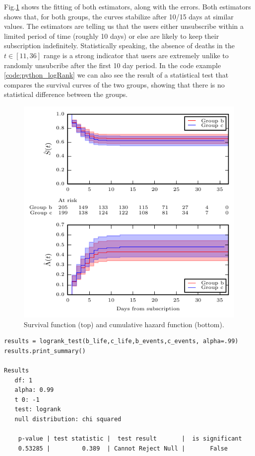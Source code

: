 \documentclass[paper=a4, fontsize=11pt]{report}
\begin{document}
Fig.\ref{fig:survival} shows the fitting of both estimators, along with the errors. Both estimators shows that, for both groups,
the curves stabilize after 10/15 days at similar values. The estimators are telling us that the users
either unsubscribe within a limited period of time (roughly 10 days) or else are likely to keep their subscription indefinitely. Statistically
speaking, the absence of deaths in the $t \in [11,36]$ range is a strong indicator that users are extremely unlike to randomly
unsubcribe after the first 10 day period. In the code example \ref{code:python_logRank} we can also see the result of a statistical test
that compares the survival curves of the two groups, showing that there is no statistical difference between the groups.

\begin{figure}[htpb!]
\centering
\includegraphics[scale = 0.8]{survival.pdf}
\caption{Survival function (top) and cumulative hazard function (bottom).}
\label{fig:survival}
\end{figure}

\scriptsize
\begin{lstlisting}[frame=single,caption=LogRank test \label{code:python_logRank}]
results = logrank_test(b_life,c_life,b_events,c_events, alpha=.99)
results.print_summary()

Results
   df: 1
   alpha: 0.99
   t 0: -1
   test: logrank
   null distribution: chi squared

    p-value | test statistic |  test result       |  is significant
    0.53285 |         0.389  | Cannot Reject Null |       False       

\end{lstlisting}
\end{document}
